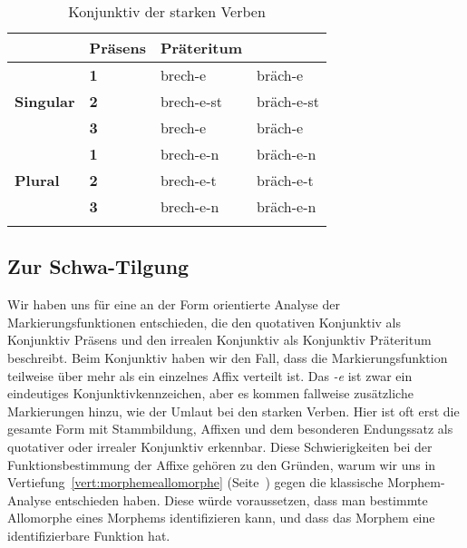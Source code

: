 \begin{table}[!htbp]
  \centering
  \begin{tabular}{llll}
    \lsptoprule
    \multicolumn{2}{c}{} & \textbf{Präsens} & \textbf{Präteritum} \\
    \midrule
    \multirow{3}{*}{\textbf{Singular}} & \textbf{1} & brech-e & bräch-e \\
    & \textbf{2} & brech-e-st & bräch-e-st \\
    & \textbf{3} & brech-e & bräch-e \\
    \midrule
    \multirow{3}{*}{\textbf{Plural}} & \textbf{1} & brech-e-n & bräch-e-n \\
    & \textbf{2} & brech-e-t & bräch-e-t \\
    & \textbf{3} & brech-e-n & bräch-e-n \\
    \lspbottomrule
  \end{tabular}
  \caption{Konjunktiv der starken Verben}
  \label{tab:konjunktiv093}
\end{table}


\subsection{Zur Schwa-Tilgung}
\label{sec:zurschwatilgung}


Wir haben uns für eine an der Form orientierte Analyse der Markierungsfunktionen entschieden, die den quotativen Konjunktiv als Konjunktiv Präsens und den irrealen Konjunktiv als Konjunktiv Präteritum beschreibt.
Beim Konjunktiv haben wir den Fall, dass die Markierungsfunktion teilweise über mehr als ein einzelnes Affix verteilt ist.
Das \textit{-e} ist zwar ein eindeutiges Konjunktivkennzeichen, aber es kommen fallweise zusätzliche Markierungen hinzu, wie \zB der Umlaut bei den starken Verben.
Hier ist oft erst die gesamte Form mit Stammbildung, Affixen und dem besonderen Endungssatz als quotativer oder irrealer Konjunktiv erkennbar.
Diese Schwierigkeiten bei der Funktionsbestimmung der Affixe gehören zu den Gründen, warum wir uns in Vertiefung~\ref{vert:morphemeallomorphe} (Seite~\pageref{vert:morphemeallomorphe}) gegen die klassische Morphem-Analyse entschieden haben.
Diese würde voraussetzen, dass man bestimmte Allomorphe eines Morphems identifizieren kann, und dass das Morphem eine identifizierbare Funktion hat.


